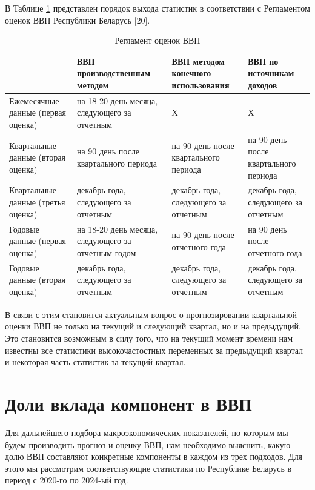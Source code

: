 \documentclass[a4paper, 14pt]{extreport}
\numberwithin{equation}{section}
\numberwithin{equation}{section}
\begin{document}
	В Таблице \ref{tab:gdp} представлен порядок выхода статистик в соответствии с Регламентом оценок ВВП Республики Беларусь [20].
	
	\begin{table}[h!]
		\centering
		\renewcommand{\arraystretch}{1.5}
		\begin{tabular}{|m{5cm}|m{3.5cm}|m{3.5cm}|m{3.5cm}|}
			\hline
			 & \textbf{ВВП производственным методом} & \textbf{ВВП методом конечного использования} & \textbf{ВВП по источникам доходов} \\ 
			\hline
			Ежемесячные данные (первая оценка) & на 18-20 день месяца, следующего за отчетным & Х & Х \\ 
			\hline
			Квартальные данные (вторая оценка) & на 90 день после квартального периода & на 90 день после квартального периода & на 90 день после квартального периода \\ 
			\hline
			Квартальные данные (третья оценка) & декабрь года, следующего за отчетным & декабрь года, следующего за отчетным & декабрь года, следующего за отчетным \\ 
			\hline
			Годовые данные (первая оценка) & на 18-20 день месяца, следующего за отчетным годом & на 90 день после отчетного года & на 90 день после отчетного года \\ 
			\hline
			Годовые данные (вторая оценка) & декабрь года, следующего за отчетным & декабрь года, следующего за отчетным & декабрь года, следующего за отчетным \\ 
			\hline
		\end{tabular}
		\caption{Регламент оценок ВВП}
		\label{tab:gdp}
	\end{table}
	
	В связи с этим становится актуальным вопрос о прогнозировании квартальной оценки ВВП не только на текущий и следующий квартал, но и на предыдущий. Это становится возможным в силу того, что на текущий момент времени нам известны все статистики высокочастостных переменных за предыдущий квартал и некоторая часть статистик за текущий квартал.
	
	\section{Доли вклада компонент в ВВП}
	
	Для дальнейшего подбора макроэкономических показателей, по которым мы будем производить прогноз и оценку ВВП, нам необходимо выяснить, какую долю ВВП составляют конкретные компоненты в каждом из трех подходов. Для этого мы рассмотрим соответствующие статистики по Республике Беларусь в период с 2020-го по 2024-ый год.
	
\end{document}
